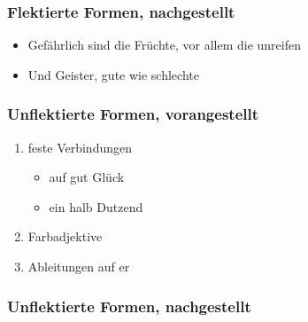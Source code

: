 \documentclass[UTF8]{report}
\begin{document}
\subsubsection{Flektierte Formen, nachgestellt}

\begin{itemize}
    \item Gefährlich sind die Früchte, vor allem die unreifen
    \item Und Geister, gute wie schlechte
\end{itemize}

\subsubsection{Unflektierte Formen, vorangestellt}
\begin{enumerate}
    \item feste Verbindungen
    \begin{itemize}
        \item auf gut Glück
        \item ein halb Dutzend
    \end{itemize}
    \item Farbadjektive
    \item Ableitungen auf er
\end{enumerate}

\subsubsection{Unflektierte Formen, nachgestellt}
\end{document}
